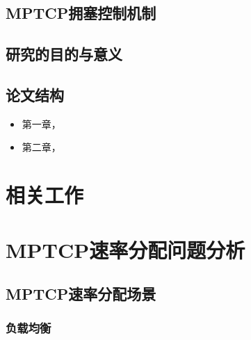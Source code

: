 \documentclass[winfonts,bachelor,oneside,nobackinfo]{njuthesis}
\begin{document}
\section{MPTCP拥塞控制机制}\label{subsec:mptcp_conges}
\lipsum[1]

\section{研究的目的与意义}
\lipsum[1]




\section{论文结构}

\lipsum[1]
\begin{itemize}
\item 第一章，
\item 第二章，

\end{itemize}



\chapter{相关工作}

\lipsum[1]

\chapter{MPTCP速率分配问题分析}

\lipsum[1]

\section{MPTCP速率分配场景}\label{sec:rate}
\lipsum[1]
\subsection{负载均衡}
\lipsum[1]
\end{document}
